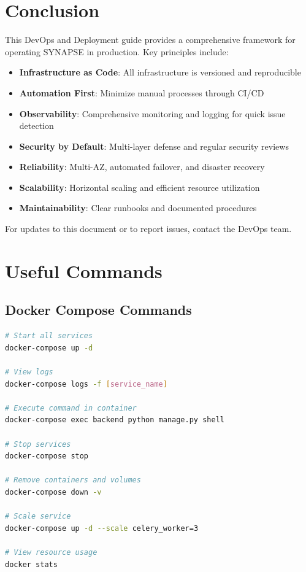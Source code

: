 \documentclass{report}
\begin{document}
\newpage

\chapter*{Conclusion}

This DevOps and Deployment guide provides a comprehensive framework for operating SYNAPSE in production. Key principles include:

\begin{itemize}
  \item \textbf{Infrastructure as Code}: All infrastructure is versioned and reproducible
  \item \textbf{Automation First}: Minimize manual processes through CI/CD
  \item \textbf{Observability}: Comprehensive monitoring and logging for quick issue detection
  \item \textbf{Security by Default}: Multi-layer defense and regular security reviews
  \item \textbf{Reliability}: Multi-AZ, automated failover, and disaster recovery
  \item \textbf{Scalability}: Horizontal scaling and efficient resource utilization
  \item \textbf{Maintainability}: Clear runbooks and documented procedures
\end{itemize}

For updates to this document or to report issues, contact the DevOps team.

\appendix

\chapter{Useful Commands}

\section{Docker Compose Commands}

\begin{lstlisting}[language=bash]
# Start all services
docker-compose up -d

# View logs
docker-compose logs -f [service_name]

# Execute command in container
docker-compose exec backend python manage.py shell

# Stop services
docker-compose stop

# Remove containers and volumes
docker-compose down -v

# Scale service
docker-compose up -d --scale celery_worker=3

# View resource usage
docker stats
\end{lstlisting}
\end{document}
